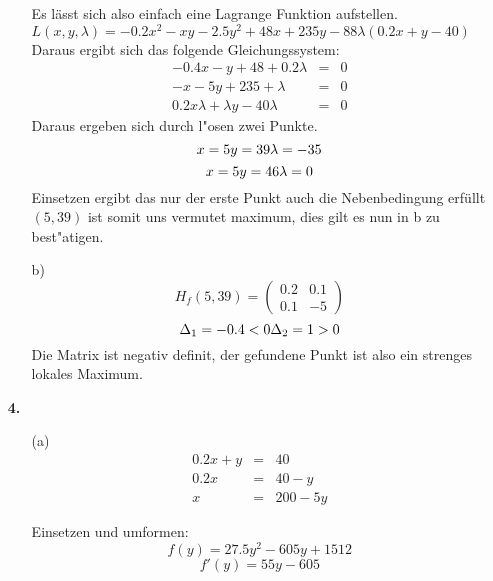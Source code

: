 \documentclass[a4paper,11pt,fleqn]{scrartcl}
\begin{document}
\begin{enumerate}
\begin{enumerate}
                Es lässt sich also einfach eine Lagrange Funktion aufstellen. \\
                $L(x,y,\lambda) = -0.2x^2 - xy - 2.5y^2 + 48x + 235y - 88 \lambda(0.2x+y-40)$ \\
                Daraus ergibt sich das folgende Gleichungssystem:
                \begin{eqnarray*}
                    -0.4x - y+48 + 0.2 \lambda &=& 0\\
                    -x - 5y + 235 + \lambda &=& 0\\
                    0.2x\lambda + \lambda y -40\lambda &=& 0 
                \end{eqnarray*} 
                Daraus ergeben sich durch l"osen zwei Punkte.
                \[x = 5  \\ 
                y = 39 \\
                \lambda = -35\]
                \[x = 5  \\ 
                y = 46 \\
                \lambda = 0\]     
                Einsetzen ergibt das nur der erste Punkt auch die Nebenbedingung erfüllt $(5,39)$ ist somit uns vermutet maximum, dies gilt es nun in b zu best"atigen.
            \item[b)]
                \[H_f(5, 39) =
                \begin{pmatrix}
                    0.2 & 0.1 \\
                    0.1 & -5
                \end{pmatrix} \]
                \[
                \Delta_1 = -0.4 < 0 \\
                \Delta_2 = 1 > 0
                \]
                Die Matrix ist negativ definit, der gefundene Punkt ist also ein strenges lokales Maximum.
        \end{enumerate}
    \item[\textbf{4.}]
        \begin{enumerate}
            \item[(a)]
                \begin{eqnarray*}
                    0.2x+y &=& 40\\
                    0.2x &=& 40-y\\
                    x &=& 200 - 5y 
                \end{eqnarray*}

                Einsetzen und umformen:
                $$f(y) = 27.5y^2 - 605y + 1512$$
                $$f'(y) = 55y - 605$$



\end{enumerate}
\end{enumerate}
\end{document}
